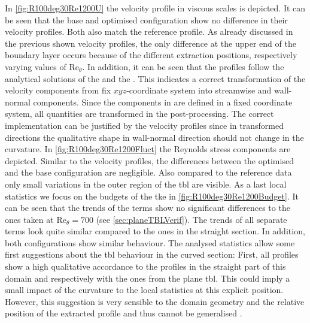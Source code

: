 In \autoref{fig:R100deg30Re1200U} the velocity profile in viscous scales is depicted.
It can be seen that the base and optimised configuration show no difference in their velocity profiles.
Both also match the reference profile.
As already discussed in the previous shown velocity profiles, the only difference at the upper end of the boundary layer occurs because of the different extraction positions, respectively varying values of $\mathrm{Re}_{\theta}$. 
In addition, it can be seen that the profiles follow the analytical solutions of the  and the .
This indicates a correct transformation of the velocity components from fix $xyz$-coordinate system into streamwise and wall-normal components. 
Since the components in  are defined in a fixed coordinate system, all quantities are transformed in the post-processing.
The correct implementation can be justified by the velocity profiles since in transformed directions the qualitative shape in wall-normal direction should not change in the curvature.
In \autoref{fig:R100deg30Re1200Fluct} the Reynolds stress components are depicted.
Similar to the velocity profiles, the differences between the optimised and the base configuration are negligible.
Also compared to the reference data only small variations in the outer region of the \acrshort{tbl} are visible.
As a last local statistics we focus on the budgets of the \acrshort{tke} in \autoref{fig:R100deg30Re1200Budget}.
It can be seen that the trends of the terms show no significant differences to the ones taken at $\mathrm{Re}_{\theta} = 700$ (see \autoref{sec:planeTBLVerif}).
The trends of all separate terms look quite similar compared to the ones in the straight section. 
In addition, both configurations show similar behaviour.
The analysed statistics allow some first suggestions about the \acrshort{tbl} behaviour in the curved section:
First, all profiles show a high qualitative accordance to the profiles in the straight part of this domain and respectively with the ones from the plane \acrshort{tbl}.
This could imply a small impact of the curvature to the local statistics at this explicit position.
However, this suggestion is very sensible to the domain geometry and the relative position of the extracted profile and thus cannot be generalised \citep{patel_longitudinal_1997}.


